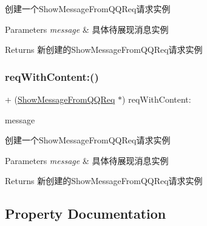 创建一个\+Show\+Message\+From\+Q\+Q\+Req请求实例 
\begin{DoxyParams}{Parameters}
{\em message} & 具体待展现消息实例 \\
\hline
\end{DoxyParams}
\begin{DoxyReturn}{Returns}
新创建的\+Show\+Message\+From\+Q\+Q\+Req请求实例 
\end{DoxyReturn}
\mbox{\label{interface_show_message_from_q_q_req_a2e2c1650edb56da63200e52974d7b263}} 
\subsubsection{\texorpdfstring{req\+With\+Content\+:()}{reqWithContent:()}\hspace{0.1cm}{\footnotesize\ttfamily [2/2]}}
{\footnotesize\ttfamily + (\mbox{\hyperlink{interface_show_message_from_q_q_req}{Show\+Message\+From\+Q\+Q\+Req}} $\ast$) req\+With\+Content\+: \begin{DoxyParamCaption}\item[{(\mbox{\hyperlink{interface_q_q_api_object}{Q\+Q\+Api\+Object}} $\ast$)}]{message }\end{DoxyParamCaption}}

创建一个\+Show\+Message\+From\+Q\+Q\+Req请求实例 
\begin{DoxyParams}{Parameters}
{\em message} & 具体待展现消息实例 \\
\hline
\end{DoxyParams}
\begin{DoxyReturn}{Returns}
新创建的\+Show\+Message\+From\+Q\+Q\+Req请求实例 
\end{DoxyReturn}


\subsection{Property Documentation}
\mbox{\label{interface_show_message_from_q_q_req_a4be2560234bc92e36b5c63fe1c0e57f4}} 
